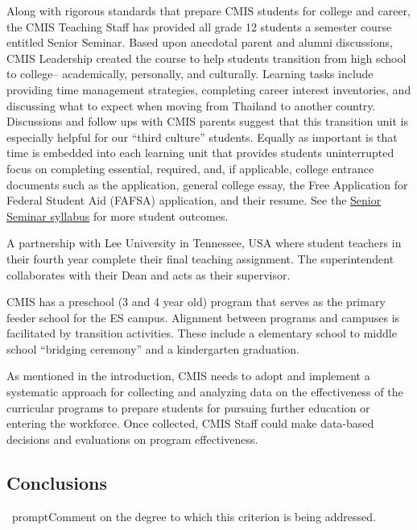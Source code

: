 \documentclass{report}
\begin{document}
\begin{findings}
Along with rigorous standards that prepare CMIS students for college and career, the CMIS Teaching Staff has provided all grade 12 students a semester course entitled Senior Seminar. Based upon anecdotal parent and alumni discussions, CMIS Leadership created the course to help students transition from high school to college-- academically, personally, and culturally. Learning tasks include providing time management strategies, completing career interest inventories, and discussing what to expect when moving from Thailand to another country. Discussions and follow ups with CMIS parents suggest that this transition unit is especially helpful for our “third culture” students. Equally as important is that time is embedded into each learning unit that provides students uninterrupted focus on completing essential, required, and, if applicable, college entrance documents such as the application, general college essay, the Free Application for Federal Student Aid (FAFSA) application, and their resume. See the \href{https://docs.google.com/document/d/18kR5KtmfaH0cXUem7C2YUkeOWLfFMl_x3ekP-plvyRk/edit}{Senior Seminar syllabus} for more student outcomes. 


A partnership with Lee University in Tennessee, USA where student teachers in their fourth year complete their final teaching assignment. The superintendent collaborates with their Dean and acts as their supervisor.

CMIS has a preschool (3 and 4 year old) program that serves as the primary feeder school for the ES campus.  Alignment between programs and campuses is facilitated by transition activities. These include a elementary school to middle school “bridging ceremony” and a kindergarten graduation.


As mentioned in the introduction, CMIS needs to adopt and implement a systematic approach for collecting and analyzing data on the effectiveness of the curricular programs to prepare students for pursuing further education or entering the workforce. Once collected, CMIS Staff could make data-based decisions and evaluations on program effectiveness. 
\end{findings}

\subsection{Conclusions}
\
prompt{Comment on the degree to which this criterion is being addressed.}
\end{document}
